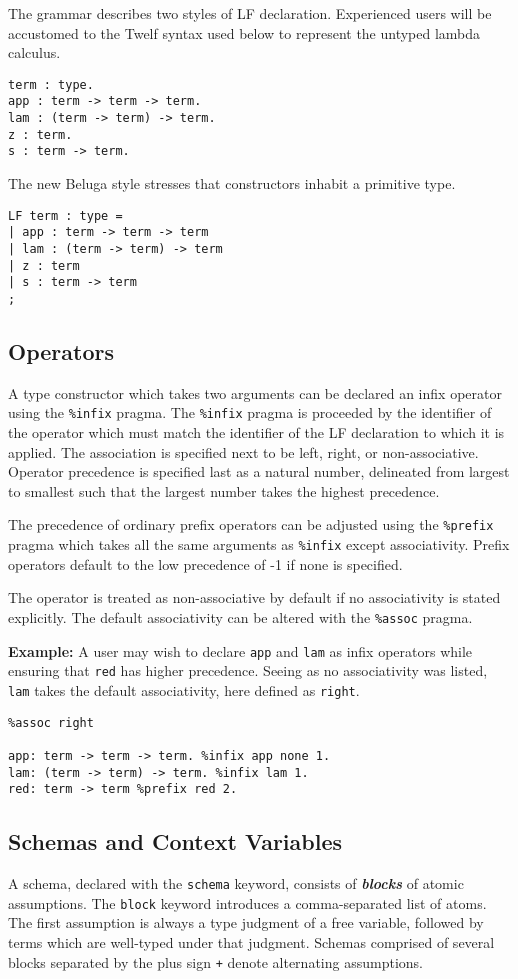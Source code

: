 \documentclass[11pt]{article}
\begin{document}
The grammar describes two styles of LF declaration. Experienced users will be accustomed to the Twelf syntax used below to represent the untyped lambda calculus.
\begin{verbatim}
term : type.
app : term -> term -> term.
lam : (term -> term) -> term.
z : term.
s : term -> term.
\end{verbatim}

The new Beluga style stresses that constructors inhabit a primitive type.
\begin{verbatim}
LF term : type =
| app : term -> term -> term
| lam : (term -> term) -> term
| z : term
| s : term -> term
;
\end{verbatim}

\subsection{Operators}
A type constructor which takes two arguments can be declared an infix operator using the \texttt{\%infix} pragma. The \texttt{\%infix} pragma is proceeded by the identifier of the operator which must match the identifier of the LF declaration to which it is applied. The association is specified next to be left, right, or non-associative. Operator precedence is specified last as a natural number, delineated from largest to smallest such that the largest number takes the highest precedence.

The precedence of ordinary prefix operators can be adjusted using the \texttt{\%prefix} pragma which takes all the same arguments as \texttt{\%infix} except associativity. Prefix operators default to the low precedence of -1 if none is specified.

The operator is treated as non-associative by default if no associativity is stated explicitly. The default associativity can be altered with the \texttt{\%assoc} pragma.

\textbf{Example:} A user may wish to declare \texttt{app} and \texttt{lam} as infix operators while ensuring that \texttt{red} has higher precedence. Seeing as no associativity was listed, \texttt{lam} takes the default associativity, here defined as \texttt{right}.
\begin{verbatim}
%assoc right

app: term -> term -> term. %infix app none 1.
lam: (term -> term) -> term. %infix lam 1.
red: term -> term %prefix red 2. 
\end{verbatim}

\subsection{Schemas and Context Variables}
A schema, declared with the \texttt{schema} keyword, consists of \textbf{\textit{blocks}} of atomic assumptions. The \texttt{block} keyword introduces a comma-separated list of atoms. The first assumption is always a type judgment of a free variable, followed by terms which are well-typed under that judgment. Schemas comprised of several blocks separated by the plus sign \texttt{+} denote alternating assumptions. 
\end{document}
